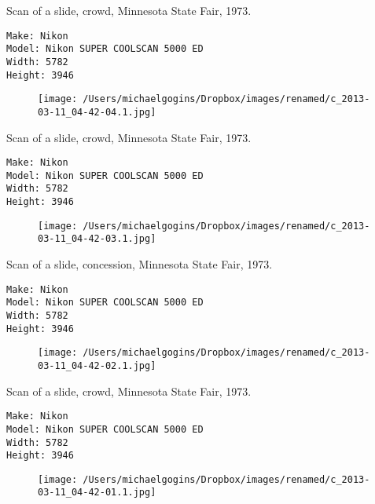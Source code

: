 \documentclass[11pt,letter,DIV=14,paper=landscape]{scrbook}
\begin{document}
\clearpage
\noindent Scan of a slide, crowd, Minnesota State Fair, 1973.
\noindent
\begin{lstlisting}
Make: Nikon
Model: Nikon SUPER COOLSCAN 5000 ED
Width: 5782
Height: 3946
\end{lstlisting}
\clearpage

\begin{figure}
\texttt{[image: /Users/michaelgogins/Dropbox/images/renamed/c\_2013-03-11\_04-42-04.1.jpg]}
\end{figure}
    
\clearpage
\noindent Scan of a slide, crowd, Minnesota State Fair, 1973.
\noindent
\begin{lstlisting}
Make: Nikon
Model: Nikon SUPER COOLSCAN 5000 ED
Width: 5782
Height: 3946
\end{lstlisting}
\clearpage

\begin{figure}
\texttt{[image: /Users/michaelgogins/Dropbox/images/renamed/c\_2013-03-11\_04-42-03.1.jpg]}
\end{figure}
    
\clearpage
\noindent Scan of a slide, concession, Minnesota State Fair, 1973.
\noindent
\begin{lstlisting}
Make: Nikon
Model: Nikon SUPER COOLSCAN 5000 ED
Width: 5782
Height: 3946
\end{lstlisting}
\clearpage

\begin{figure}
\texttt{[image: /Users/michaelgogins/Dropbox/images/renamed/c\_2013-03-11\_04-42-02.1.jpg]}
\end{figure}
    
\clearpage
\noindent Scan of a slide, crowd, Minnesota State Fair, 1973.
\noindent
\begin{lstlisting}
Make: Nikon
Model: Nikon SUPER COOLSCAN 5000 ED
Width: 5782
Height: 3946
\end{lstlisting}
\clearpage

\begin{figure}
\texttt{[image: /Users/michaelgogins/Dropbox/images/renamed/c\_2013-03-11\_04-42-01.1.jpg]}
\end{figure}
    
\end{document}
